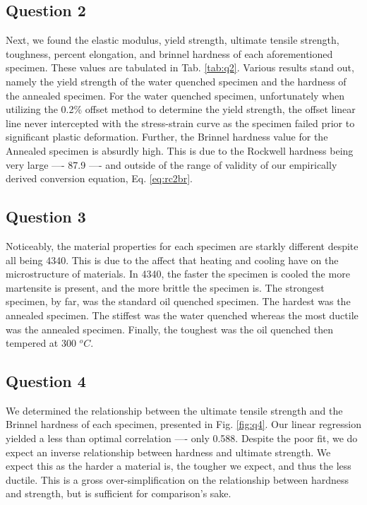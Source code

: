 \documentclass{article}
\begin{document}
\subsection*{Question 2}
Next, we found the elastic modulus, yield strength, ultimate tensile strength, toughness, percent elongation, and brinnel hardness of each aforementioned specimen. These values are tabulated in Tab. \ref{tab:q2}. Various results stand out, namely the yield strength of the water quenched specimen and the hardness of the annealed specimen. For the water quenched specimen, unfortunately when utilizing the 0.2\% offset method to determine the yield strength, the offset linear line never intercepted with the stress-strain curve as the specimen failed prior to significant plastic deformation. Further, the Brinnel hardness value for the Annealed specimen is absurdly high. This is due to the Rockwell hardness being very large ---- 87.9 ---- and outside of the range of validity of our empirically derived conversion equation, Eq. \ref{eq:rc2br}.

\subsection*{Question 3}
Noticeably, the material properties for each specimen are starkly different despite all being 4340. This is due to the affect that heating and cooling have on the microstructure of materials. In 4340, the faster the specimen is cooled the more martensite is present, and the more brittle the specimen is. The strongest specimen, by far, was the standard oil quenched specimen. The hardest was the annealed specimen. The stiffest was the water quenched whereas the most ductile was the annealed specimen. Finally, the toughest was the oil quenched then tempered at 300 $^oC$.

\subsection*{Question 4}
We determined the relationship between the ultimate tensile strength and the Brinnel hardness of each specimen, presented in Fig. \ref{fig:q4}. Our linear regression yielded a less than optimal correlation ---- only 0.588. Despite the poor fit, we do expect an inverse relationship between hardness and ultimate strength. We expect this as the harder a material is, the tougher we expect, and thus the less ductile. This is a gross over-simplification on the relationship between hardness and strength, but is sufficient for comparison's sake. 
\end{document}
